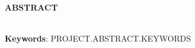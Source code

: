 \documentclass[12pt, a4paper]{book}
\begin{document}
\large
\begin{center}
	\textbf{ABSTRACT}
\end{center}

\normalsize
\lipsum[2-4] \\%

\textbf{Keywords}: PROJECT.ABSTRACT.KEYWORDS

\break
\end{document}
